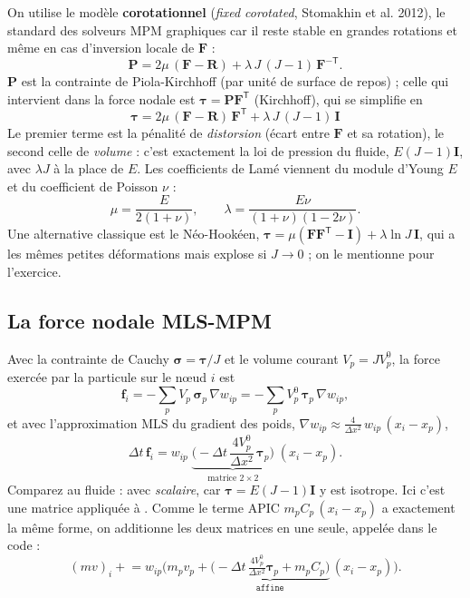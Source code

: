 \documentclass[11pt,a4paper]{article}
\newcommand{\code}[1]{\texttt{\detokenize{#1}}}
\newcommand{\bm}[1]{\boldsymbol{#1}}
\begin{document}
On utilise le modèle \textbf{corotationnel} (\emph{fixed corotated}, Stomakhin et al. 2012), le
standard des solveurs MPM graphiques car il reste stable en grandes rotations et même en cas
d'inversion locale de $\mathbf F$ :
\[
  \mathbf P = 2\mu\,(\mathbf F - \mathbf R) + \lambda\,J\,(J-1)\,\mathbf F^{-\mathsf T}.
\]
$\mathbf P$ est la contrainte de Piola-Kirchhoff (par unité de surface de repos) ; celle qui
intervient dans la force nodale est $\bm\tau = \mathbf P\mathbf F^{\mathsf T}$ (Kirchhoff), qui se
simplifie en
\[
  \boxed{\;\bm\tau = 2\mu\,(\mathbf F - \mathbf R)\,\mathbf F^{\mathsf T} + \lambda\,J\,(J-1)\,\mathbf I\;}
\]
Le premier terme est la pénalité de \emph{distorsion} (écart entre $\mathbf F$ et sa rotation),
le second celle de \emph{volume} : c'est exactement la loi de pression du fluide,
$E(J-1)\mathbf I$, avec $\lambda J$ à la place de $E$. Les coefficients de Lamé viennent du module
d'Young $E$ et du coefficient de Poisson $\nu$ :
\[
  \mu = \frac{E}{2(1+\nu)},\qquad \lambda = \frac{E\nu}{(1+\nu)(1-2\nu)}.
\]
Une alternative classique est le Néo-Hookéen, $\bm\tau = \mu(\mathbf F\mathbf F^{\mathsf T} - \mathbf I) + \lambda\ln J\,\mathbf I$,
qui a les mêmes petites déformations mais explose si $J\to0$ ; on le mentionne pour l'exercice.

\subsection{La force nodale MLS-MPM}

Avec la contrainte de Cauchy $\bm\sigma = \bm\tau/J$ et le volume courant $V_p = J V_p^0$, la force
exercée par la particule sur le n\oe ud $i$ est
\[
  \mathbf f_i = -\sum_p V_p\,\bm\sigma_p\,\nabla w_{ip} = -\sum_p V_p^0\,\bm\tau_p\,\nabla w_{ip},
\]
et avec l'approximation MLS du gradient des poids, $\nabla w_{ip} \approx \frac{4}{\Delta x^2}\,w_{ip}\,(x_i - x_p)$,
\[
  \Delta t\,\mathbf f_i = w_{ip}\;\underbrace{\Big(-\Delta t\,\frac{4 V_p^0}{\Delta x^2}\,\bm\tau_p\Big)}_{\text{matrice } 2\times2}\;(x_i - x_p).
\]
Comparez au fluide : \code{stress * dpos} avec \code{stress} \emph{scalaire}, car
$\bm\tau = E(J-1)\mathbf I$ y est isotrope. Ici c'est une matrice appliquée à \code{dpos}.
Comme le terme APIC $m_p C_p\,(x_i - x_p)$ a exactement la même forme, on additionne les deux
matrices en une seule, appelée \code{affine} dans le code :
\[
  (mv)_i \mathrel{+}= w_{ip}\Big( m_p v_p + \underbrace{\big(-\Delta t\,\tfrac{4V_p^0}{\Delta x^2}\bm\tau_p + m_p C_p\big)}_{\texttt{affine}}\,(x_i - x_p)\Big).
\]
\end{document}
